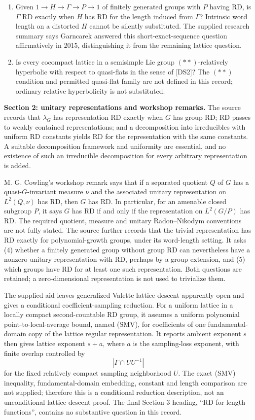 \documentclass[11pt]{article}
\begin{document}
\begin{enumerate}
\item Given $1\to H\to\Gamma\to P\to1$ of finitely generated groups with $P$ having RD, is $\Gamma$ RD exactly when $H$ has RD for the length induced from $\Gamma$? Intrinsic word length on a distorted $H$ cannot be silently substituted. The supplied research summary says Garncarek answered this short-exact-sequence question affirmatively in 2015, distinguishing it from the remaining lattice question.
\item Is every cocompact lattice in a semisimple Lie group $(**)$-relatively hyperbolic with respect to quasi-flats in the sense of [DS2]? The $(**)$ condition and permitted quasi-flat family are not defined in this record; ordinary relative hyperbolicity is not substituted.
\end{enumerate}

\textbf{Section 2: unitary representations and workshop remarks.} The source records that $\lambda_G$ has representation RD exactly when $G$ has group RD; RD passes to weakly contained representations; and a decomposition into irreducibles with uniform RD constants yields RD for the representation with the same constants. A suitable decomposition framework and uniformity are essential, and no existence of such an irreducible decomposition for every arbitrary representation is added.

M. G. Cowling's workshop remark says that if a separated quotient $Q$ of $G$ has a quasi-$G$-invariant measure $\nu$ and the associated unitary representation on $L^2(Q,\nu)$ has RD, then $G$ has RD. In particular, for an amenable closed subgroup $P$, it says $G$ has RD if and only if the representation on $L^2(G/P)$ has RD. The required quotient, measure and unitary Radon--Nikodym conventions are not fully stated. The source further records that the trivial representation has RD exactly for polynomial-growth groups, under its word-length setting. It asks (4) whether a finitely generated group without group RD can nevertheless have a nonzero unitary representation with RD, perhaps by a group extension, and (5) which groups have RD for at least one such representation. Both questions are retained; a zero-dimensional representation is not used to trivialize them.

The supplied aid leaves generalized Valette lattice descent apparently open and gives a conditional coefficient-sampling reduction. For a uniform lattice in a locally compact second-countable RD group, it assumes a uniform polynomial point-to-local-average bound, named (SMV), for coefficients of one fundamental-domain copy of the lattice regular representation. It reports ambient exponent $s$ then gives lattice exponent $s+a$, where $a$ is the sampling-loss exponent, with finite overlap controlled by
\[
 |\Gamma\cap UU^{-1}|
\]
for the fixed relatively compact sampling neighborhood $U$. The exact (SMV) inequality, fundamental-domain embedding, constant and length comparison are not supplied; therefore this is a conditional reduction description, not an unconditional lattice-descent proof. The final Section 3 heading, ``RD for length functions'', contains no substantive question in this record.
\end{document}
